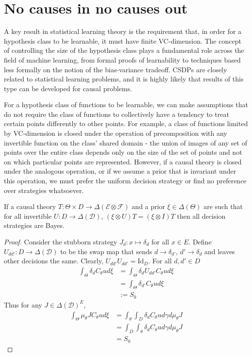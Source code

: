 
\section{No causes in no causes out}

A key result in statistical learning theory is the requirement that, in order for a hypothesis class to be learnable, it must have finite VC-dimension. The concept of controlling the size of the hypothesis class plays a fundamental role across the field of machine learning, from formal proofs of learnability to techniques based less formally on the notion of the bias-variance tradeoff. CSDPs are closely related to statistical learning problems, and it is highly likely that results of this type can be developed for causal problems.

For a hypothesis class of functions to be learnable, we can make assumptions that do not require the class of functions to collectively have a tendency to treat certain points differently to other points. For example, a class of functions limited by VC-dimension is closed under the operation of precomposition with any invertible function on the class' shared domain - the union of images of any set of points over the entire class depends only on the size of the set of points and not on which particular points are represented. However, if a causal theory is closed under the analogous operation, or if we assume a prior that is invariant under this operation, we must prefer the uniform decision strategy or find no preference over strategies whatsoever.

\begin{theorem}\label{th:ncinco}
If a causal theory $T:\Theta\times D\to \Delta(\mathcal{E}\otimes\mathcal{F})$ and a prior $\xi\in \Delta(\Theta)$ are such that for all invertible $U:D\to \Delta(\mathcal{D})$, $(\xi\otimes U)T = (\xi\otimes I)T$ then all decision strategies are Bayes.
\end{theorem}

\begin{proof}
Consider the stubborn strategy $J_d:x\mapsto \delta_d$ for all $x\in E$. Define $U_{dd'}:D\to \Delta(\mathcal{D})$ to be the swap map that sends $d\to \delta_{d'}$, $d'\to \delta_{d}$ and leaves other decisions the same. Clearly, $U_{dd'} U_{dd'} = \mathrm{Id}_D$. For all $d,d'\in D$
\begin{align}
	\int_\Theta \delta_d C_\theta u d\xi &= \int_\Theta \delta_d U_{dd'} C_\theta u d\xi\\
										&= \int_\Theta \delta_{d'} C_\theta u d\xi\\
										 &:= S_0
\end{align}
Thus for any $J\in \Delta(\mathcal{D})^E$,
\begin{align}
	\int_\Theta \mu_\theta J C_\theta u d\xi &= \int_\theta \int_D \delta_d C_\theta u d\gamma d\mu_\theta J\\
											 &= \int_D \int_\theta \delta_d C_\theta u d\gamma d\mu_\theta J\\
											 &= S_0
\end{align}
\end{proof}

